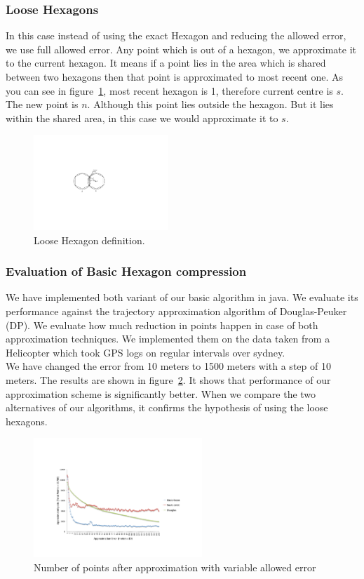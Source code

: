 \documentclass[conference]{IEEEtran}
\begin{document}
\subsubsection{Loose Hexagons}
In this case instead of using the exact Hexagon and reducing the allowed error, we use full allowed error. Any 
point which is out of a hexagon, we approximate it to the current hexagon. It means if a point lies in the area which 
is shared between two hexagons then that point is approximated to most recent one. As you can see in 
figure~\ref{fig:loose-hexagon}, most recent hexagon is 1, therefore current centre is $s$. The new point is $n$. 
Although this point lies outside the hexagon. But it lies within the shared area, in this case we would approximate it to $s$.

\begin{figure}[ht]
  \centering
  \includegraphics[width=2in]{images/loose-hexagon-shared.pdf}
  \caption {Loose Hexagon definition.}
  \label{fig:loose-hexagon}
\end{figure}

\subsubsection{Evaluation of Basic Hexagon compression}
We have implemented both variant of our basic algorithm in java. We evaluate its performance against the trajectory 
approximation algorithm of Douglas-Peuker (DP). We evaluate how much reduction in points happen in case of both 
approximation techniques. We implemented them on the data taken from a Helicopter which took GPS logs on regular 
intervals over sydney.\\
We have changed the error from 10 meters to 1500 meters with a step of 10 meters. The results are shown in 
figure~\ref{fig:performance-graph}. It shows that performance of our approximation scheme is significantly better. 
When we compare the two alternatives of our algorithms, it confirms the hypothesis of using the loose hexagons.

\begin{figure}[ht]
  \centering
  \includegraphics[width=2.5in]{images/basic-points.pdf}
  \caption {Number of points after approximation with variable allowed error}
  \label{fig:performance-graph}
\end{figure}
\end{document}
